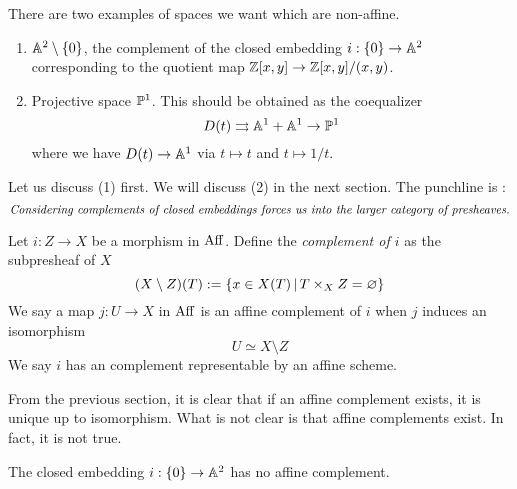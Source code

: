 \documentclass[./main.tex]{subfiles}
\begin{document}
There are two examples of spaces we want which are non-affine.
\begin{enumerate}
  \item $\mathbb{A}^2 \setminus \left\{0\right\}$, the complement of 
  the closed embedding $i : \left\{0\right\} \to \mathbb{A}^2$
  corresponding to the quotient map
  $\mathbb{Z}[x , y] \to \mathbb{Z}[x , y] / (x , y)$.
  \item Projective space $\mathbb{P}^1$.
  This should be obtained as the coequalizer 
  \[
    D(t) \rightrightarrows \mathbb{A}^1 + \mathbb{A}^1 \to \mathbb{P}^1  
  \]
  where we have $D(t) \to \mathbb{A}^1$ via $t \mapsto t$ and $t \mapsto 1 / t$.
\end{enumerate}
Let us discuss (1) first.
We will discuss (2) in the next section.
The punchline is : 
\[
  \text{\emph{Considering complements of closed embeddings
  forces us into the larger category of presheaves.}}  
\]
\begin{dfn}[Complements]
  
  Let $i : Z \to X$ be a morphism in $\mathrm{Aff}$.
  Define the \emph{complement of $i$} as the subpresheaf of $X$
  \[
    (X \setminus Z) (T) := 
    \left\{x \in X(T) \,|\, T \times_X Z = \varnothing\right\}
  \]
  We say a map $j : U \to X$ in $\mathrm{Aff}$
  is an affine complement of $i$ when 
  $j$ induces an isomorphism \[
    U \simeq X \setminus Z  
  \]
  We say $i$ has an complement representable by an affine scheme.
\end{dfn}
From the previous section,
it is clear that if an affine complement exists, 
it is unique up to isomorphism.
What is not clear is that affine complements exist.
In fact, it is not true.
\begin{prop}
  
  The closed embedding $i : \left\{0\right\} \to \mathbb{A}^2$ has no affine complement.
\end{prop}
\end{document}
